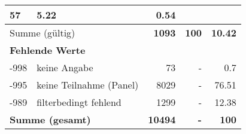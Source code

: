 \begin{longtable}{lXrrr}
       \num{57} &
       \num[round-mode=places,round-precision=2]{5.22} &
         \num[round-mode=places,round-precision=2]{0.54} \\
     \midrule
     \multicolumn{2}{l}{Summe (gültig)} &
       \textbf{\num{1093}} &
     \textbf{\num{100}} &
       \textbf{\num[round-mode=places,round-precision=2]{10.42}} \\
     \multicolumn{5}{l}{\textbf{Fehlende Werte}}\\
       -998 &
       keine Angabe &
         \num{73} &
        - &
         \num[round-mode=places,round-precision=2]{0.7} \\
       -995 &
       keine Teilnahme (Panel) &
         \num{8029} &
        - &
         \num[round-mode=places,round-precision=2]{76.51} \\
       -989 &
       filterbedingt fehlend &
         \num{1299} &
        - &
         \num[round-mode=places,round-precision=2]{12.38} \\
     \midrule
     \multicolumn{2}{l}{\textbf{Summe (gesamt)}} &
          \textbf{\num{10494}} &
        \textbf{-} &
        \textbf{\num{100}} \\
     \bottomrule
     \end{longtable}
     
